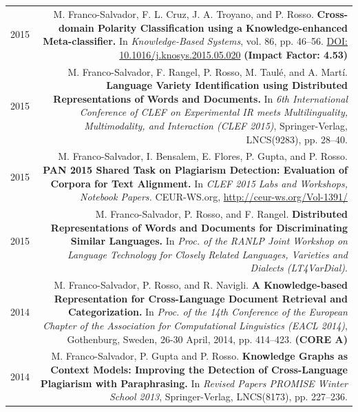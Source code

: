 \documentclass[10pt]{article}
\begin{document}
\section*{}
\begin{tabular}{L!{\VRule}R}
    2015&M. Franco-Salvador, F. L. Cruz, J. A. Troyano, and P. Rosso. \textbf{Cross-domain Polarity Classification using a Knowledge-enhanced Meta-classifier.}	
	In \emph{Knowledge-Based Systems}, vol. 86, pp. 46--56. \href{http://dx.doi.org/10.1016/j.knosys.2015.05.020}{DOI: 10.1016/j.knosys.2015.05.020} \textbf{(Impact Factor: 4.53)} \vspace{5pt}\\
	2015&M. Franco-Salvador, F. Rangel, P. Rosso, M. Taul{\'e}, and A. Mart{\'i}. \textbf{Language Variety Identification using Distributed Representations of Words and Documents.}
	In \emph{6th International Conference of CLEF on Experimental IR meets Multilinguality, Multimodality, and Interaction (CLEF 2015)}, Springer-Verlag, LNCS(9283), pp. 28--40. \vspace{5pt}\\
	2015&M. Franco-Salvador, I. Bensalem, E. Flores, P. Gupta, and P. Rosso. \textbf{PAN 2015 Shared Task on Plagiarism Detection: Evaluation of Corpora for Text Alignment.}
	In \emph{CLEF 2015 Labs and Workshops, Notebook Papers.} CEUR-WS.org, \href{http://ceur-ws.org/Vol-1391/}{http://ceur-ws.org/Vol-1391/} \vspace{5pt}\\
	2015&M. Franco-Salvador, P. Rosso, and F. Rangel. \textbf{Distributed Representations of Words and Documents for Discriminating Similar Languages.}
	In \emph{Proc. of the RANLP Joint Workshop on Language Technology for Closely Related Languages, Varieties and Dialects (LT4VarDial)}. \vspace{5pt}\\
	2014&M. Franco-Salvador, P. Rosso, and R. Navigli. \textbf{A Knowledge-based Representation for Cross-Language Document Retrieval and Categorization.}
	In \emph{Proc. of the 14th Conference of the European Chapter of the Association for Computational Linguistics (EACL 2014)}, Gothenburg, Sweden, 26-30 April, 2014, pp. 414--423. \textbf{(CORE A)} \vspace{5pt}\\
	2014&M. Franco-Salvador, P. Gupta and P. Rosso. \textbf{Knowledge Graphs as Context Models: Improving the Detection of Cross-Language Plagiarism with Paraphrasing.}
	In \emph{Revised Papers PROMISE Winter School 2013}, Springer-Verlag, LNCS(8173), pp. 227--236.\vspace{5pt}\\

\end{tabular}
\end{document}
